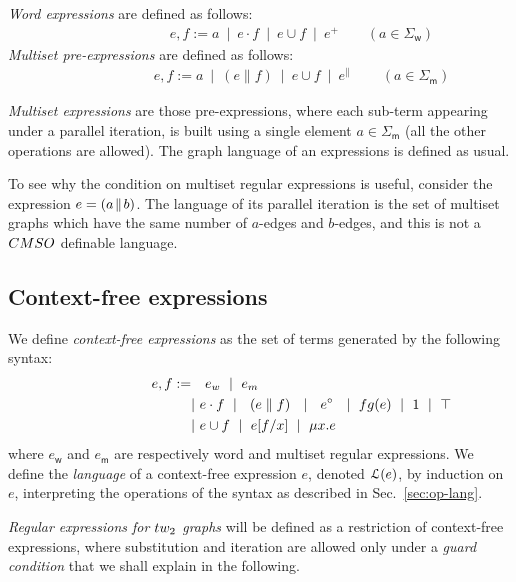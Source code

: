 \begin{definition}
\emph{Word expressions} are defined as follows:
\begin{align*}
\qquad\qquad \qquad e,f := a\ \mid \ e\cdot f\ \mid \ e\cup f\ \mid \ e^+\qquad (a\in \Sigma_\mathsf{w})
\end{align*}
\emph{Multiset pre-expressions} are defined  as follows:
\begin{align*}
\qquad\qquad \qquad e,f := a\ \mid \ (e\parallel f) \ \mid \ e\cup f\ \mid \  e^\parallel\ \qquad (a\in \Sigma_\mathsf{m})
\end{align*}

\emph{Multiset expressions} are those pre-expressions, where each sub-term appearing under a parallel iteration, is built using a  single element $a\in \Sigma_\mathsf{m}$ (all the other operations are allowed). The graph language of an expressions is defined as usual. 
\end{definition}
\begin{remark}
To see why the condition on multiset regular expressions is useful, consider the expression $e=(a\!\parallel\! b)$. The language of its parallel iteration is the set of multiset graphs which have the same number of $a$-edges and $b$-edges, and this is  not  a $\CMSO$ definable language. 
\end{remark}


\subsection{Context-free expressions}

\begin{definition}
We define \emph{context-free expressions} as the set of terms generated by the following syntax:
\begin{align*}
\qquad\qquad \qquad e,f := &\ \ \ e_\mathsf{w}\ \mid\ e_\mathsf{m}\\
       & |\ e\cdot f \ \mid\ \  (e \parallel f)\ \ \mid\ \ e^\circ  \ \ \mid\ \dom(e) \ \mid\ 1\ \mid\ \top \\
       & |\ e\cup f \ \mid\  e[f/x] \ \mid\ \mu x. e
\end{align*}
where $e_{\mathsf{w}}$ and $e_{\mathsf{m}}$ are respectively word and multiset regular expressions.  We define the \emph{language} of a context-free expression $e$, denoted $\mathcal L(e)$, by induction on $e$, interpreting the operations of the syntax as described in Sec.~\ref{sec:op-lang}. 
\end{definition}
\emph{Regular expressions for $\TWT$ graphs} will be defined as a restriction of context-free expressions, where substitution and iteration are allowed only under a \emph{guard condition} that we shall explain in the following. 
 



